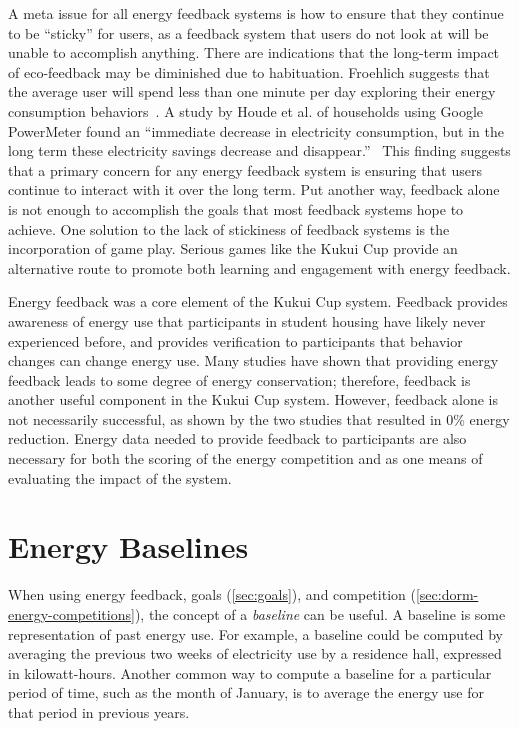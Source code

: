 A meta issue for all energy feedback systems is how to ensure that they continue to be ``sticky'' for users, as a feedback system that users do not look at will be unable to accomplish anything. There are indications that the long-term impact of eco-feedback may be diminished due to habituation. Froehlich suggests that the average user will spend less than one minute per day exploring their energy consumption behaviors~\cite{Froehlich2010-BECC}. A study by Houde et al. of households using Google PowerMeter found an ``immediate decrease in electricity consumption, but in the long term these electricity savings decrease and disappear.''~\cite{Houde2013-powermeter} This finding suggests that a primary concern for any energy feedback system is ensuring that users continue to interact with it over the long term. Put another way, feedback alone is not enough to accomplish the goals that most feedback systems hope to achieve. One solution to the lack of stickiness of feedback systems is the incorporation of game play. Serious games like the Kukui Cup provide an alternative route to promote both learning and engagement with energy feedback.

Energy feedback was a core element of the Kukui Cup system. Feedback provides awareness of energy use that participants in student housing have likely never experienced before, and provides verification to participants that behavior changes can change energy use. Many studies have shown that providing energy feedback leads to some degree of energy conservation; therefore, feedback is another useful component in the Kukui Cup system. However, feedback alone is not necessarily successful, as shown by the two studies that resulted in 0\% energy reduction. Energy data needed to provide feedback to participants are also necessary for both the scoring of the energy competition and as one means of evaluating the impact of the system.


\section{Energy Baselines}
\label{sec:energy-baselines}

When using energy feedback, goals (\autoref{sec:goals}), and competition (\autoref{sec:dorm-energy-competitions}), the concept of a \emph{baseline} can be useful. A baseline is some representation of past energy use. For example, a baseline could be computed by averaging the previous two weeks of electricity use by a residence hall, expressed in kilowatt-hours. Another common way to compute a baseline for a particular period of time, such as the month of January, is to average the energy use for that period in previous years.

